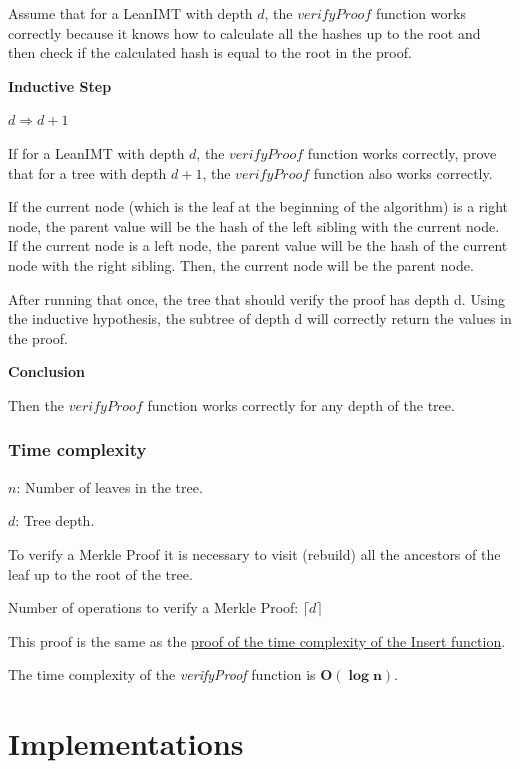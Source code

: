 \documentclass{article}
\begin{document}
Assume that for a LeanIMT with depth $d$, the $verifyProof$ function works correctly because it knows how to calculate all the hashes up to the root and then check if the calculated hash is equal to the root in the proof.

\textbf{Inductive Step}

$d \Rightarrow d+1$

If for a LeanIMT with depth $d$, the $verifyProof$ function works correctly, prove that for a tree with depth $d + 1$, the $verifyProof$ function also works correctly.

If the current node (which is the leaf at the beginning of the algorithm) is a right node, the parent value will be the hash of the left sibling with the current node.
If the current node is a left node, the parent value will be the hash of the current node with the right sibling.
Then, the current node will be the parent node.

After running that once, the tree that should verify the proof has depth d. Using the inductive hypothesis, the subtree of depth d will correctly return the values in the proof.

\textbf{Conclusion}

Then the $verifyProof$ function works correctly for any depth of the tree.


\subsubsection{Time complexity}



$n$: Number of leaves in the tree.

$d$: Tree depth.



To verify a Merkle Proof it is necessary to visit (rebuild) all the ancestors of the leaf up to the root of the tree.



Number of operations to verify a Merkle Proof: $\lceil d \rceil$

This proof is the same as the \hyperref[InsertProof]{proof of the time complexity of the Insert function}.

The time complexity of the \textit{verifyProof} function is $\boldsymbol{O(\log n)}$.



\section{Implementations}
\end{document}
